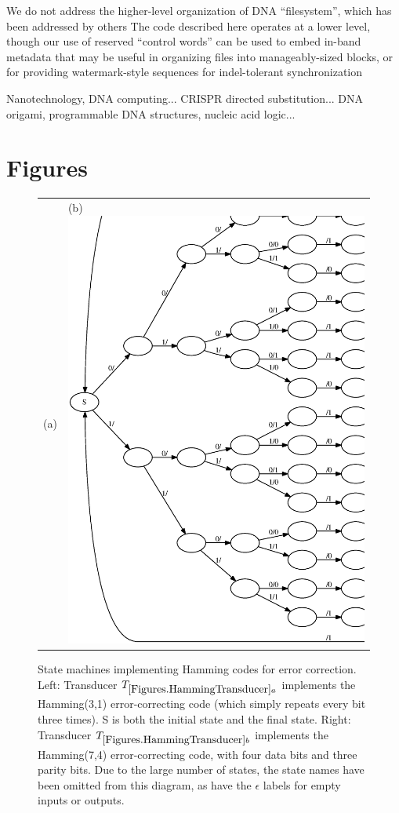 \documentclass[english]{article}
\begin{document}
We do not address the higher-level organization of DNA ``filesystem'',
which has been addressed by others \cite{YazdiEtAl2015}
The code described here operates at a lower level, though our use of reserved ``control words''
can be used to embed in-band metadata that may be useful in organizing files into manageably-sized blocks,
or for providing watermark-style sequences for indel-tolerant synchronization

Nanotechnology, DNA computing...
CRISPR directed substitution...
DNA origami, programmable DNA structures, nucleic acid logic...


\newpage
\section{Figures}

\newpage
\begin{figure}
\begin{tabular}{ll}
(a) {hamming31}{width=.45\textwidth}
&
(b) \includegraphics[width=.45\textwidth]{hamming74.ps}
\end{tabular}
\caption{ 
State machines implementing Hamming codes for error correction.
  Left:
Transducer $\hammingthreeone$ implements the Hamming(3,1) error-correcting code
(which simply repeats every bit three times).
S is both the initial state and the final state.
Right:
Transducer $\hammingsevenfour$ implements the Hamming(7,4) error-correcting code,
with four data bits and three parity bits.
Due to the large number of states, the state names have been omitted from this diagram,
as have the $\epsilon$ labels for empty inputs or outputs.
}
\end{figure}
\end{document}
